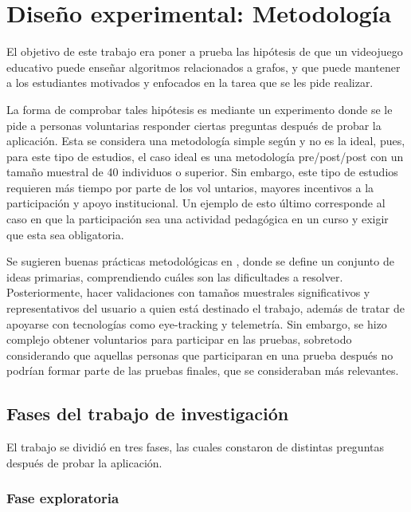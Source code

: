 \chapter{Diseño experimental: Metodología}

El objetivo de este trabajo era poner a prueba las hipótesis de que un videojuego educativo puede enseñar algoritmos relacionados a grafos, y que puede mantener a los estudiantes motivados y enfocados en la tarea que se les pide realizar. 

La forma de comprobar tales hipótesis es mediante un experimento donde se le pide a personas voluntarias responder ciertas preguntas después de probar la aplicación. Esta se considera una metodología simple según \cite{HowGamesComputingEducationEvaluated} y no es la ideal, pues, para este tipo de estudios, el caso ideal es una metodología pre/post/post con un tamaño muestral de 40 individuos o superior. Sin embargo, este tipo de estudios requieren más tiempo por parte de los vol untarios, mayores incentivos a la participación y apoyo institucional. Un ejemplo de esto último corresponde al caso en que la participación sea una actividad pedagógica en un curso y exigir que esta sea obligatoria.

Se sugieren buenas prácticas metodológicas en \cite{Rogers2002InteractionDesign, MeegaPlusManual, HowGamesComputingEducationEvaluated}, donde se define un conjunto de ideas primarias, comprendiendo cuáles son las dificultades a resolver. Posteriormente, hacer validaciones con tamaños muestrales significativos y representativos del usuario a quien está destinado el trabajo, además de tratar de apoyarse con tecnologías como eye-tracking y telemetría. Sin embargo, se hizo complejo obtener voluntarios para participar en las pruebas, sobretodo considerando que aquellas personas que participaran en una prueba después no podrían formar parte de las pruebas finales, que se consideraban más relevantes.


\section{Fases del trabajo de investigación}

El trabajo se dividió en tres fases, las cuales constaron de distintas preguntas después de probar la aplicación.

\subsection{Fase exploratoria}

